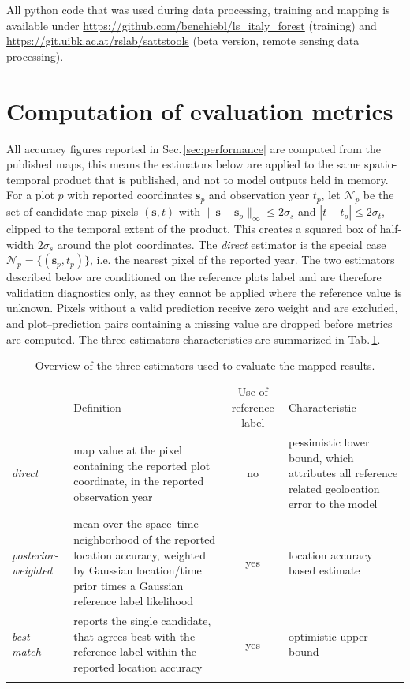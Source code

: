 \documentclass[essd, manuscript]{copernicus}
\begin{document}
All python code that was used during data processing, training and mapping is available under \url{https://github.com/benehiebl/ls_italy_forest} (training) and \url{https://git.uibk.ac.at/rslab/sattstools} (beta version, remote sensing data processing).



\appendix
\section{Computation of evaluation metrics}    %
\label{sec:appendix_metrics}

All accuracy figures reported in Sec.\,\ref{sec:performance} are computed from the published maps, this means the estimators below are applied to the same spatio-temporal product that is published, and not to model outputs held in memory. For a plot $p$ with reported coordinates $\mathbf{s}_p$ and observation year $t_p$, let $\mathcal{N}_p$ be the set of candidate map pixels $(\mathbf{s},t)$ with $\lVert \mathbf{s}-\mathbf{s}_p \rVert_\infty \le 2 \sigma_s$ and $|t-t_p| \le 2 \sigma_t$, clipped to the temporal extent of the product. This creates a squared box of half-width $2 \sigma_s$ around the plot coordinates. The \emph{direct} estimator is the special case $\mathcal{N}_p=\{(\mathbf{s}_p,t_p)\}$, i.e. the nearest pixel of the reported year. The two estimators described below are conditioned on the reference plots label and are therefore validation diagnostics only, as they cannot be applied where the reference value is unknown. Pixels without a valid prediction receive zero weight and are excluded, and plot--prediction pairs containing a missing value are dropped before metrics are computed. The three estimators characteristics are summarized in Tab.\,\ref{tab:estimators}.

\begin{table}[t]
\caption{Overview of the three estimators used to evaluate the mapped results.}
\label{tab:estimators}
\small
\begin{tabularx}{\textwidth}{@{} l X c X @{}}
    \tophline
    & Definition & Use of reference label & Characteristic  \\
    \middlehline
    \emph{direct}              & map value at the pixel containing the reported plot coordinate, in the reported observation year & no & pessimistic lower bound, which attributes all reference related geolocation error to the model \\
    \emph{posterior-weighted}  & mean over the space--time neighborhood of the reported location accuracy, weighted by Gaussian location/time prior times a Gaussian reference label likelihood & yes & location accuracy based estimate \\
    \emph{best-match}          & reports the single candidate, that agrees best with the reference label within the reported location accuracy & yes & optimistic upper bound \\
    \bottomhline
\end{tabularx}
\belowtable{} %
\end{table}
\end{document}
